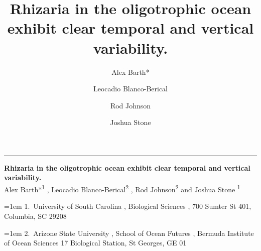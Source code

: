 \documentclass[
]{article}
\title{Rhizaria in the oligotrophic ocean exhibit clear temporal and
vertical variability.}
\author{Alex Barth* \and Leocadio Blanco-Berical \and Rod
Johnson \and Joshua Stone}
\date{}
\begin{document}
    \begin{titlepage}

\raggedleft %
\rule{1pt}{\textheight} %
\hspace{0.05\textwidth} %
\begin{minipage}[b][\textheight][s]{0.85\textwidth}

\raggedright
{\large\bfseries\nohyphens{Rhizaria in the oligotrophic ocean exhibit
clear temporal and vertical variability.}}\\[2\baselineskip] 

  
 {\large{Alex Barth*}}{\textsuperscript{1}}%
%
, 
 {\large{Leocadio Blanco-Berical}}{\textsuperscript{2}}%
%
, 
 {\large{Rod Johnson}}{\textsuperscript{2}}%
%
%
{ and \large{Joshua Stone}}%
{\textsuperscript{1}}%
%



  
\vspace{2\baselineskip} 

\hangindent=1em
%
{1}.~{University of South Carolina}%
%
, %
{Biological Sciences}%
%
%
, %
{700 Sumter St 401, Columbia, SC 29208}%
%
\par\hangindent=1em%
%
{2}.~{Arizone State University}%
%
, %
{School of Ocean Futures}%
%
%
, %
{Bermuda Institute of Ocean Sciences 17 Biological Station, St Georges,
GE 01}%
%

  
\vspace{1\baselineskip} 

                  


\end{minipage}
\end{titlepage}
\end{document}
